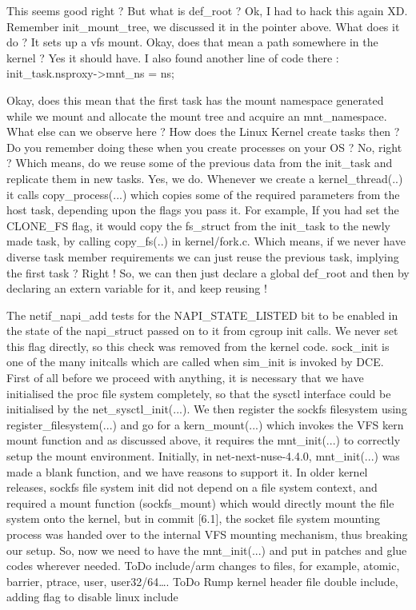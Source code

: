 \documentclass{sig-alternate}
\begin{document}
This seems good right ? But what  is def\_root ? Ok, I had to hack this again XD.
Remember init\_mount\_tree, we discussed it in the pointer above. What does it do ?  It sets up a vfs mount. Okay, does that mean a path somewhere 
in the kernel ? Yes it should have. I also found another line of code there : 
init\_task.nsproxy->mnt\_ns = ns;

Okay, does this mean that the first task has the mount namespace generated while we mount and allocate the mount tree and acquire an mnt\_namespace. 
What else can we observe here ? How does the Linux Kernel create tasks then ? Do you remember doing these when you create processes on your OS ? 
No, right ? Which means, do we reuse some of the previous data from the init\_task and replicate them in new tasks. Yes, we do. Whenever we create 
a kernel\_thread(..) it calls copy\_process(...) which copies some of the required parameters from the host task, depending upon the flags you pass 
it. For example, If you had set the CLONE\_FS flag, it would copy the fs\_struct from the init\_task to the newly made task, by calling copy\_fs(..)
in kernel/fork.c. Which means, if we never have diverse task member requirements we can just reuse the previous task, implying the first task ?  
Right ! So, we can then just declare a global def\_root and then by declaring an extern variable for it, and keep reusing !

The netif\_napi\_add tests for the NAPI\_STATE\_LISTED bit to be enabled in the state of the napi\_struct passed on to it from cgroup init calls. 
We never set this flag directly, so this check was removed from the kernel code. sock\_init is one of the many initcalls which are called when 
sim\_init is invoked by DCE. First of all before we proceed with anything, it is necessary that we have initialised the proc file system completely,
so that the sysctl interface could be initialised by the net\_sysctl\_init(...). We then register the sockfs filesystem using register\_filesystem(...) 
and go for a kern\_mount(...) which invokes the VFS kern mount function and as discussed above, it requires the mnt\_init(...) to correctly setup 
the mount environment. Initially, in net-next-nuse-4.4.0, mnt\_init(...)  was made a blank function, and we have reasons to support it. 
In older kernel releases, sockfs file system init did not depend on a file system context, and required a mount function (sockfs\_mount) which
would directly mount the file system onto the kernel, but in commit [6.1], the socket file system mounting process was handed over to the
internal VFS mounting mechanism, thus breaking our setup. So, now we need to have the mnt\_init(...) and put in patches and glue codes wherever
needed. ToDo include/arm changes to files, for example, atomic, barrier, ptrace, user, user32/64….
ToDo Rump kernel header file double include, adding flag to disable linux include
\end{document}
